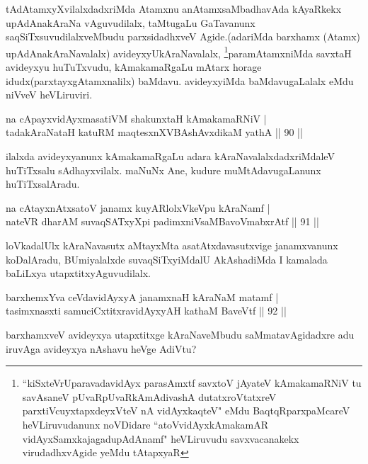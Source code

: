 \begin{artha}
tAdAtamxyXvilalxdadxriMda Atamxnu anAtamxsaMbadhavAda kAyaRkekx upAdAnakAraNa vAguvudilalx, taMtugaLu GaTavanunx saqSiTxsuvudilalxveMbudu parxsidadhxveV Agide.(adariMda barxhamx (Atamx) upAdAnakAraNavalalx) avideyxyUkAraNavalalx, \footnote{``kiSxteVrUparavadavidAyx parasAmxtf savxtoV jAyateV kAmakamaRNiV tu savAsaneV pUvaRpUvaRkAmAdivashA dutatxroVtatxreV parxtiVcuyxtapxdeyxVteV nA vidAyxkaqteV" eMdu BaqtqRparxpaMcareV heVLiruvudanunx noVDidare ``atoVvidAyxkAmakamAR vidAyxSamxkajagadupAdAnamf" heVLiruvudu savxvacanakekx virudadhxvAgide yeMdu tAtapxyaR}paramAtamxniMda savxtaH avideyxyu huTuTxvudu, kAmakamaRgaLu mAtarx horage idudx(parxtayxgAtamxnalilx) baMdavu. avideyxyiMda baMdavugaLalalx eMdu niVveV heVLiruviri.
\end{artha}


\begin{shl}
na cApayxvidAyxmasatiVM shakunxtaH kAmakamaRNiV |\\
tadakAraNataH katuRM maqtesxnXVBAshAvxdikaM yathA \hfill || 90 ||
\end{shl}

\begin{artha}
ilalxda avideyxyanunx kAmakamaRgaLu adara kAraNavalalxdadxriMdaleV huTiTxsalu 
sAdhayxvilalx. maNuNx Ane, kudure muMtAdavugaLanunx huTiTxsalAradu.
\end{artha}

\begin{shl}
na cAtayxnAtxsatoV janamx kuyARlolxVkeV\s pu kAraNamf |\\
nateVR dharAM suvaqSATxyX\s pi padimxniVsaMBavoV\s mabxrAtf \hfill || 91 ||
\end{shl}

\begin{artha}
loVkadalUlx kAraNavasutx aMtayxMta asatAtxdavasutxvige janamxvanunx koDalAradu, BUmiyalalxde suvaqSiTxyiMdalU AkAshadiMda I kamalada baLiLxya utapxtitxyAguvudilalx.
\end{artha}

\begin{shl}
barxhemxYva ceVdavidAyxyA janamxnaH kAraNaM matamf |\\
tasimxnasxti samuciCxtitxravidAyxyAH kathaM BaveVtf \hfill || 92 ||
\end{shl}

\begin{artha}
barxhamxveV avideyxya  utapxtitxge kAraNaveMbudu saMmatavAgidadxre adu iruvAga avideyxya nAshavu heVge AdiVtu?
\end{artha}

